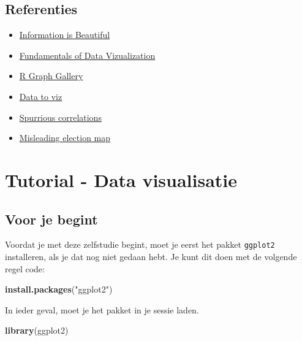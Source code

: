 \documentclass[]{tufte-book}
\newenvironment{Shaded}{}{}
\newcommand{\KeywordTok}[1]{\textcolor[rgb]{0.00,0.44,0.13}{\textbf{#1}}}
\newcommand{\NormalTok}[1]{#1}
\newcommand{\StringTok}[1]{\textcolor[rgb]{0.25,0.44,0.63}{#1}}
\providecommand{\tightlist}{%
  \setlength{\itemsep}{0pt}\setlength{\parskip}{0pt}}
\begin{document}
\hypertarget{referenties-1}{%
\section{Referenties}\label{referenties-1}}

\begin{itemize}
\tightlist
\item
  \href{https://informationisbeautiful.net/}{Information is Beautiful}
\item
  \href{https://serialmentor.com/dataviz/}{Fundamentals of Data Vizualization}
\item
  \href{https://www.r-graph-gallery.com/}{R Graph Gallery}
\item
  \href{https://www.data-to-viz.com/}{Data to viz}
\item
  \href{https://www.tylervigen.com/spurious-correlations}{Spurrious correlations}
\item
  \href{https://edition.cnn.com/2020/01/17/politics/donald-trump-2016-map-county-by-county/index.html}{Misleading election map}
\end{itemize}

\hypertarget{tutorial---data-visualisatie}{%
\chapter{Tutorial - Data visualisatie}\label{tutorial---data-visualisatie}}

\hypertarget{voor-je-begint}{%
\section{Voor je begint}\label{voor-je-begint}}

Voordat je met deze zelfstudie begint, moet je eerst het pakket \texttt{ggplot2} installeren, als je dat nog niet gedaan hebt. Je kunt dit doen met de volgende regel code:

\begin{Shaded}
\begin{Highlighting}[]
\KeywordTok{install.packages}\NormalTok{(}\StringTok{"ggplot2"}\NormalTok{)}
\end{Highlighting}
\end{Shaded}

In ieder geval, moet je het pakket in je sessie laden.

\begin{Shaded}
\begin{Highlighting}[]
\KeywordTok{library}\NormalTok{(ggplot2)}
\end{Highlighting}
\end{Shaded}
\end{document}
